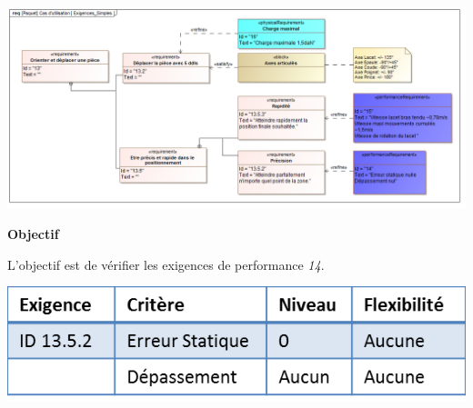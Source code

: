 \documentclass[11pt,oneside]{article}
\begin{document}
\begin{center}
\includegraphics[width=.95\linewidth]{png/req}
\end{center}

\begin{obj}
\begin{minipage}[c]{.5\linewidth}
\textbf{Objectif}

L'objectif est de vérifier les exigences de performance \textit{14}.
\end{minipage}\hfill
\begin{minipage}[c]{.45\linewidth}
\begin{center}
\includegraphics[width=.95\linewidth]{png/cdc}
\end{center}
\end{minipage}
\end{obj}
\end{document}
